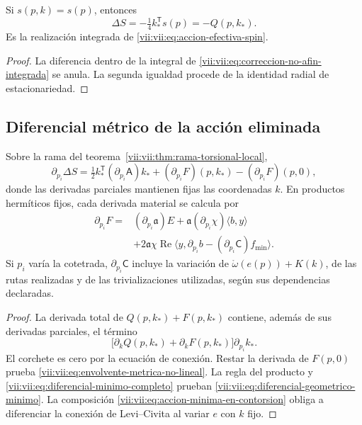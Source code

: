 \begin{corollary}
\label{vii:vii:cor:recuperacion-eliminacion-afin}
Si \(s(p,k)=s(p)\), entonces
\[
 \Delta S=-\tfrac14 k_*^{\mathsf T}s(p)=-Q(p,k_*).
\]
Es la realización integrada de
\eqref{vii:vii:eq:accion-efectiva-spin}.
\end{corollary}
\begin{proof}
La diferencia dentro de la integral de
\eqref{vii:vii:eq:correccion-no-afin-integrada} se anula. La segunda
igualdad procede de la identidad radial de estacionariedad.
\end{proof}

\subsection{Diferencial métrico de la acción eliminada}
\label{vii:vii:subsec:diferencial-metrico-no-lineal}

\begin{theorem}
\label{vii:vii:thm:envolvente-metrica}
Sobre la rama del teorema~\ref{vii:vii:thm:rama-torsional-local},
\begin{equation}
 \partial_{p_i}\Delta S
 =\tfrac12 k_*^{\mathsf T}(\partial_{p_i}\mathsf A)k_*
  +(\partial_{p_i}F)(p,k_*)-(\partial_{p_i}F)(p,0),
 \label{vii:vii:eq:envolvente-metrica-no-lineal}
\end{equation}
donde las derivadas parciales mantienen fijas las coordenadas \(k\).
En productos hermíticos fijos, cada derivada material se calcula por
\begin{equation}
 \begin{split}
 \partial_{p_i}F={}&(\partial_{p_i}\mathfrak a)E
       +\mathfrak a(\partial_{p_i}\chi)\langle b,y\rangle\\
   &+2\mathfrak a\chi\operatorname{Re}
       \langle y,\partial_{p_i}b
                    -(\partial_{p_i}\mathsf C)f_{\min}\rangle.
 \end{split}
 \label{vii:vii:eq:diferencial-geometrico-minimo}
\end{equation}
Si \(p_i\) varía la cotetrada, \(\partial_{p_i}\mathsf C\)
incluye la variación de
\(\mathring\omega(e(p))+K(k)\), de las rutas realizadas y de
las trivializaciones utilizadas, según sus dependencias declaradas.
\end{theorem}

\begin{proof}
La derivada total de \(Q(p,k_*)+F(p,k_*)\) contiene, además
de sus derivadas parciales, el término
\[
 \bigl[\partial_kQ(p,k_*)+\partial_kF(p,k_*)\bigr]
                      \partial_{p_i}k_*.
\]
El corchete es cero por la ecuación de conexión. Restar la derivada
de \(F(p,0)\) prueba
\eqref{vii:vii:eq:envolvente-metrica-no-lineal}.
La regla del producto y
\eqref{vii:vii:eq:diferencial-minimo-completo} prueban
\eqref{vii:vii:eq:diferencial-geometrico-minimo}. La composición
\eqref{vii:vii:eq:accion-minima-en-contorsion} obliga a diferenciar
la conexión de Levi--Civita al variar \(e\) con \(k\) fijo.
\end{proof}

